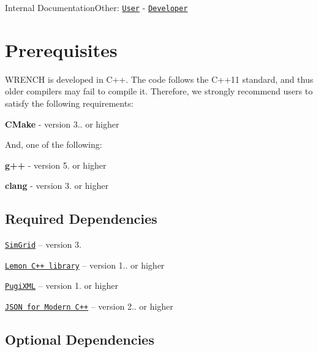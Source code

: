 Internal DocumentationOther\+: \href{../user/install.html}{\tt User} -\/ \href{../developer/install.html}{\tt Developer}\hypertarget{install_install-prerequisites}{}\section{Prerequisites}\label{install_install-prerequisites}
W\+R\+E\+N\+CH is developed in {\ttfamily C++}. The code follows the C++11 standard, and thus older compilers may fail to compile it. Therefore, we strongly recommend users to satisfy the following requirements\+:


\begin{DoxyItemize}
\item {\bfseries C\+Make} -\/ version 3.. or higher
\end{DoxyItemize}

And, one of the following\+:
\begin{DoxyItemize}
\item {\bfseries g++} -\/ version 5. or higher
\item {\bfseries clang} -\/ version 3. or higher
\end{DoxyItemize}\hypertarget{install_install-prerequisites-dependencies}{}\subsection{Required Dependencies}\label{install_install-prerequisites-dependencies}

\begin{DoxyItemize}
\item \href{https://simgrid.org/}{\tt Sim\+Grid} -- version 3.
\item \href{http://lemon.cs.elte.hu/}{\tt Lemon C++ library} -- version 1.. or higher
\item \href{http://pugixml.org/}{\tt Pugi\+X\+ML} -- version 1. or higher
\item \href{https://github.com/nlohmann/json}{\tt J\+S\+ON for Modern C++} -- version 2.. or higher
\end{DoxyItemize}\hypertarget{install_install-prerequisites-opt-dependencies}{}\subsection{Optional Dependencies}\label{install_install-prerequisites-opt-dependencies}

